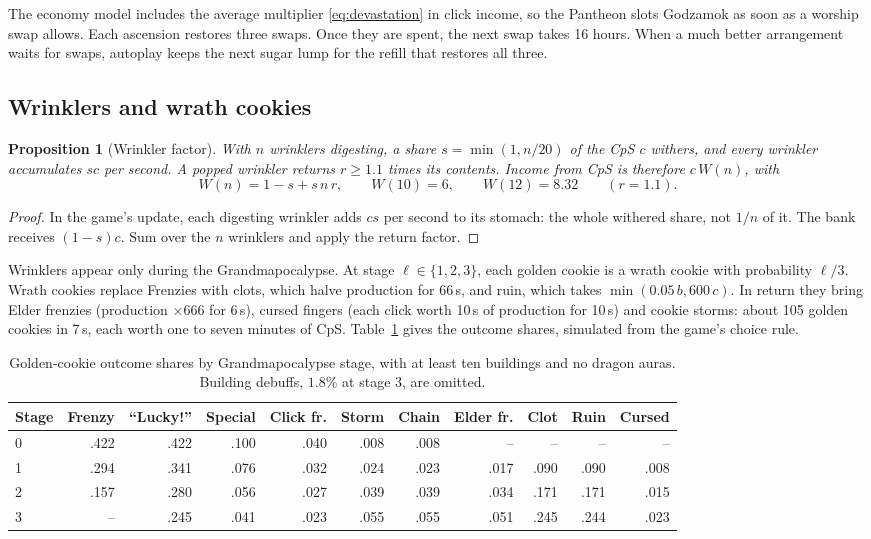 \documentclass[11pt,a4paper]{article}
\numberwithin{equation}{section}
\newtheorem{proposition}[theorem]{Proposition}
\theoremstyle{definition}
\theoremstyle{remark}
\newcommand{\Lucky}{\textup{``Lucky!''}}
\begin{document}
The economy model includes the average multiplier \eqref{eq:devastation} in click income, so the Pantheon slots Godzamok as soon as a worship swap allows. Each ascension restores three swaps. Once they are spent, the next swap takes 16 hours. When a much better arrangement waits for swaps, autoplay keeps the next sugar lump for the refill that restores all three.

\subsection{Wrinklers and wrath cookies}\label{sec:wrath}
\begin{proposition}[Wrinkler factor]\label{prop:wrinklers}
With $n$ wrinklers digesting, a share $s=\min(1,n/20)$ of the CpS $c$ withers, and every wrinkler accumulates $sc$ per second. A popped wrinkler returns $r\ge1.1$ times its contents. Income from CpS is therefore $c\,W(n)$, with
\begin{equation}\label{eq:wrinklers}
 W(n)=1-s+s\,n\,r,\qquad W(10)=6,\qquad W(12)=8.32\qquad(r=1.1).
\end{equation}
\end{proposition}

\begin{proof}
In the game's update, each digesting wrinkler adds $cs$ per second to its stomach: the whole withered share, not $1/n$ of it. The bank receives $(1-s)c$. Sum over the $n$ wrinklers and apply the return factor.
\end{proof}

Wrinklers appear only during the Grandmapocalypse. At stage $\ell\in\{1,2,3\}$, each golden cookie is a wrath cookie with probability $\ell/3$. Wrath cookies replace Frenzies with clots, which halve production for 66\,s, and ruin, which takes $\min(0.05\,b,600\,c)$. In return they bring Elder frenzies (production $\times666$ for 6\,s), cursed fingers (each click worth 10\,s of production for 10\,s) and cookie storms: about 105 golden cookies in 7\,s, each worth one to seven minutes of CpS. Table~\ref{tab:wrath} gives the outcome shares, simulated from the game's choice rule.

\begin{table}[t]
\centering
\small
\begin{tabular}{@{}lrrrrrrrrrr@{}}
\toprule
Stage & Frenzy & \Lucky & Special & Click fr. & Storm & Chain & Elder fr. & Clot & Ruin & Cursed \\
\midrule
0 & .422 & .422 & .100 & .040 & .008 & .008 & -- & -- & -- & -- \\
1 & .294 & .341 & .076 & .032 & .024 & .023 & .017 & .090 & .090 & .008 \\
2 & .157 & .280 & .056 & .027 & .039 & .039 & .034 & .171 & .171 & .015 \\
3 & -- & .245 & .041 & .023 & .055 & .055 & .051 & .245 & .244 & .023 \\
\bottomrule
\end{tabular}
\caption{Golden-cookie outcome shares by Grandmapocalypse stage, with at least ten buildings and no dragon auras. Building debuffs, $1.8\%$ at stage 3, are omitted.}
\label{tab:wrath}
\end{table}
\end{document}
